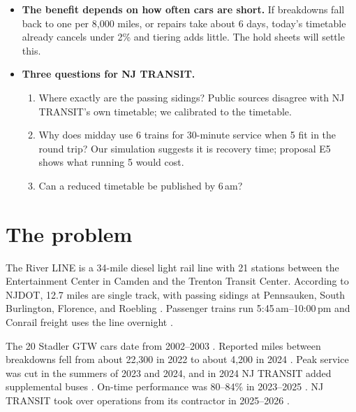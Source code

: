 \documentclass[11pt]{article}
\begin{document}
\begin{itemize}
\begin{itemize}
  \item With 7--9 cars, the loss drops from 3.5--14\% to about 2.5\%.
  \item With 10 or more cars, keep today's timetable (Section~\ref{sec:playbook}).
  \end{itemize}
\item \textbf{The benefit depends on how often cars are short.} If breakdowns fall back to one per 8{,}000 miles, or repairs take about 6 days, today's timetable already cancels under 2\% and tiering adds little. The hold sheets will settle this.
\item \textbf{Three questions for NJ TRANSIT.}
  \begin{enumerate}
  \item Where exactly are the passing sidings? Public sources disagree with NJ TRANSIT's own timetable; we calibrated to the timetable.
  \item Why does midday use 6 trains for 30-minute service when 5 fit in the round trip? Our simulation suggests it is recovery time; proposal E5 shows what running 5 would cost.
  \item Can a reduced timetable be published by 6\,am?
  \end{enumerate}
\end{itemize}

\section{The problem}\label{sec:problem}
The River LINE is a 34-mile diesel light rail line with 21 stations between the Entertainment Center in Camden and the Trenton Transit Center. According to NJDOT, 12.7 miles are single track, with passing sidings at Pennsauken, South Burlington, Florence, and Roebling \citep{njdot2021riverline}. Passenger trains run 5:45\,am--10:00\,pm and Conrail freight uses the line overnight \citep{njdot2021riverline}.

The 20 Stadler GTW cars date from 2002--2003 \citep{wiki_riverline}. Reported miles between breakdowns fell from about 22{,}300 in 2022 to about 4{,}200 in 2024 \citep{roinj2025riverline}. Peak service was cut in the summers of 2023 and 2024, and in 2024 NJ TRANSIT added supplemental buses \citep{inquirer2023,news12_2024}. On-time performance was 80--84\% in 2023--2025 \citep{njtod2025}. NJ TRANSIT took over operations from its contractor in 2025--2026 \citep{njt2025alstom}.
\end{document}
